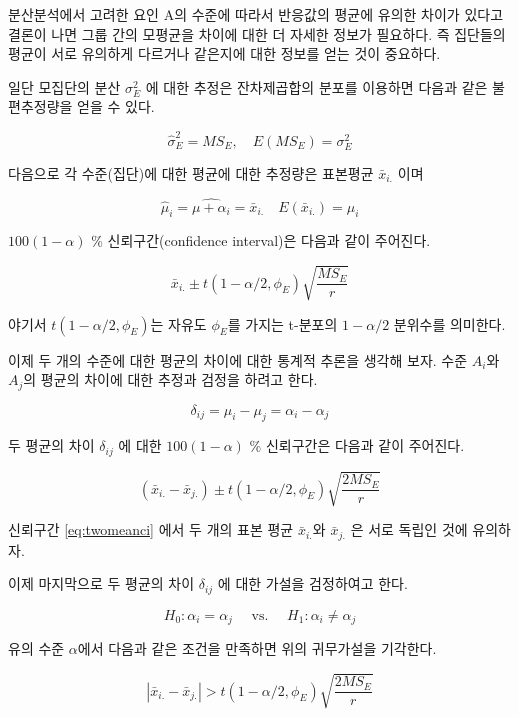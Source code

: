\documentclass[
]{book}
\begin{document}
분산분석에서 고려한 요인 A의 수준에 따라서 반응값의 평균에 유의한 차이가 있다고 결론이 나면 그룹 간의 모평균을 차이에 대한 더 자세한 정보가 필요하다. 즉 집단들의 평균이 서로 유의하게 다르거나 같은지에 대한 정보를 얻는 것이 중요하다.

일단 모집단의 분산 \(\sigma_E^2\) 에 대한 추정은 잔차제곱합의 분포를 이용하면 다음과 같은 불편추정량을 얻을 수 있다.

\[ \hat \sigma_E^2 = MS_E, \quad E(MS_E) = \sigma_E^2 \]

다음으로 각 수준(집단)에 대한 평균에 대한 추정량은 표본평균 \(\bar {x}_{i.}\) 이며

\[ \hat \mu_i = \widehat {\mu + \alpha_i} = \bar {x}_{i.}  \quad E(\bar {x}_{i.}) =\mu_i \]

\(100(1-\alpha)\) \% 신뢰구간(confidence interval)은 다음과 같이 주어진다.

\[ \bar {x}_{i.} \pm t(1-\alpha/2, \phi_E) \sqrt{ \frac{MS_E}{r}} \]

야기서 \(t(1-\alpha/2, \phi_E)\)는 자유도 \(\phi_E\)를 가지는 t-분포의 \(1-\alpha/2\) 분위수를 의미한다.

이제 두 개의 수준에 대한 평균의 차이에 대한 통계적 추론을 생각해 보자. 수준 \(A_i\)와 \(A_j\)의 평균의 차이에 대한 추정과 검정을 하려고 한다.

\[ \delta_{ij} = \mu_i-\mu_j = \alpha_i - \alpha_j \]

두 평균의 차이 \(\delta_{ij}\) 에 대한 \(100(1-\alpha)\) \% 신뢰구간은 다음과 같이 주어진다.

\begin{equation}
( \bar {x}_{i.} - \bar {x}_{j.})   \pm t(1-\alpha/2, \phi_E) \sqrt{ \frac{2MS_E}{r}} 
\label{eq:twomeanci}
\end{equation}

신뢰구간 \eqref{eq:twomeanci} 에서 두 개의 표본 평균 \(\bar {x}_{i.}\)와 \(\bar {x}_{j.}\) 은 서로 독립인 것에 유의하자.

이제 마지막으로 두 평균의 차이 \(\delta_{ij}\) 에 대한 가설을 검정하여고 한다.

\[ H_0 : \alpha_i = \alpha_j \quad \text{ vs. } \quad H_1: \alpha_i \ne \alpha_j \]

유의 수준 \(\alpha\)에서 다음과 같은 조건을 만족하면 위의 귀무가설을 기각한다.

\begin{equation}
 \left | \bar {x}_{i.} - \bar {x}_{j.} \right | > t(1-\alpha/2, \phi_E) \sqrt{ \frac{2MS_E}{r}} 
\label{eq:lsd}
\end{equation}
\end{document}
